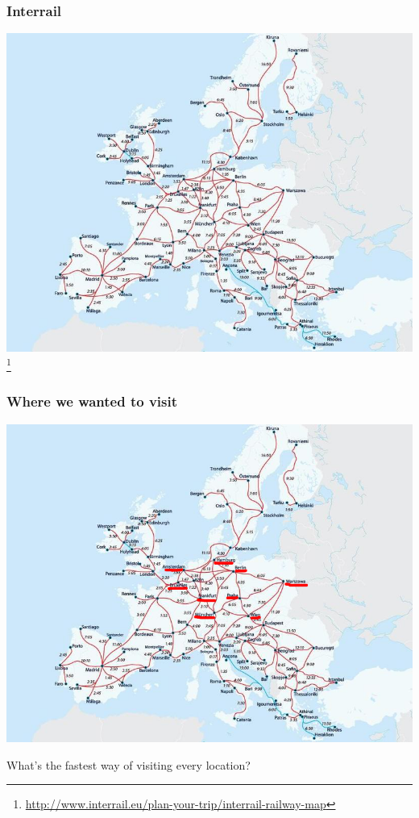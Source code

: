 \documentclass[]{beamer}
\begin{document}
\begin{frame}
\frametitle{Interrail}
\begin{center}
\includegraphics[scale=0.35]{interrail}\footnote{\url{http://www.interrail.eu/plan-your-trip/interrail-railway-map}}
\end{center}
\end{frame}

\begin{frame}
\frametitle{Where we wanted to visit}
\begin{center}
\includegraphics[scale=0.25]{interrail_selected}
\end{center}
What's the fastest way of visiting every location?
\end{frame}
\end{document}
